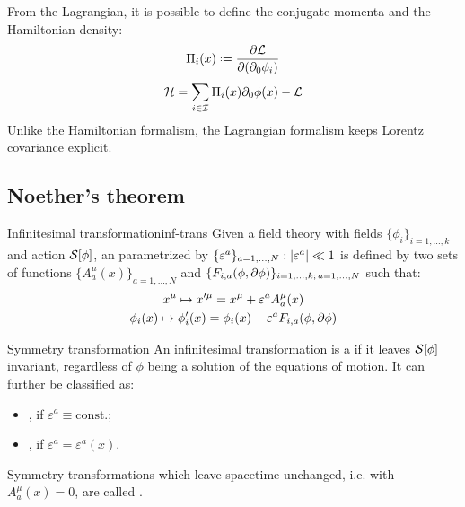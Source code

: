 From the Lagrangian, it is possible to define the conjugate momenta and the Hamiltonian density:
\begin{equation}
  \Pi_i(x) \defeq \frac{\pa \lag}{\pa (\pa_0 \phi_i)}
\end{equation}
\begin{equation}
  \mathcal{H} = \sum_{i \in \mathcal{I}} \Pi_i(x) \partial_0 \phi(x) - \mathcal{L}
\end{equation}
Unlike the Hamiltonian formalism, the Lagrangian formalism keeps Lorentz covariance explicit.

\subsection{Noether's theorem}

\begin{definition}{Infinitesimal transformation}{inf-trans}
  Given a field theory with fields $ \{\phi_i\}_{i = 1, \dots, k} $ and action $ \mathcal{S}[\phi] $, an  parametrized by $ \{\varepsilon^a\}_{a = 1, \dots, N} : \left\lvert\varepsilon^a\right\rvert \ll 1 $ is defined by two sets of functions $ \{A^\mu_a(x)\}_{a = 1, \dots, N} $ and $ \{F_{i,a}(\phi,\partial \phi)\}_{i = 1, \dots, k ;\, a = 1, \dots, N} $ such that:
  \begin{equation}
    \begin{gathered}
      x^\mu \mapsto x'^\mu = x^\mu + \varepsilon^a A^\mu_a(x) \\
      \phi_i(x) \mapsto \phi'_i(x) = \phi_i(x) + \varepsilon^a F_{i,a}(\phi, \partial \phi)
    \end{gathered}
    \label{eq:inf-transf}
  \end{equation}
\end{definition}

\begin{definition}{Symmetry transformation}{}
  An infinitesimal transformation is a  if it leaves $ \mathcal{S}[\phi] $ invariant, regardless of $ \phi $ being a solution of the equations of motion. It can further be classified as:
  \begin{itemize}
    \item {}, if $ \varepsilon^a \equiv \mathrm{const.} $;
    \item {}, if $ \varepsilon^a = \varepsilon^a(x) $.
  \end{itemize}
\end{definition}

Symmetry transformations which leave spacetime unchanged, i.e. with $ A^\mu_a(x) = 0 $, are called .

